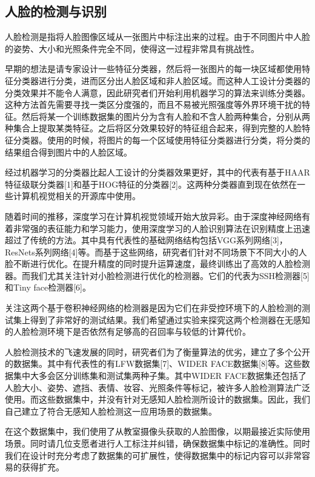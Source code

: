 \subsection{人脸的检测与识别}

人脸检测是指将人脸图像区域从一张图片中标注出来的过程。由于不同图片中人脸的姿势、大小和光照条件完全不同，使得这一过程非常具有挑战性。

早期的想法是请专家设计一些特征分类器，然后将一张图片的每一块区域都使用特征分类器进行分类，进而区分出人脸区域和非人脸区域。而这种人工设计分类器的分类效果并不能令人满意，因此研究者们开始利用机器学习的算法来训练分类器。这种方法首先需要寻找一类区分度强的，而且不易被光照强度等外界环境干扰的特征。然后将某一个训练数据集的图片分为含有人脸和不含人脸两种集合，分别从两种集合上提取某类特征。之后将区分效果较好的特征组合起来，得到完整的人脸特征分类器。使用的时候，将图片的每一个区域使用特征分类器进行分类，将分类的结果组合得到图片中的人脸区域。

经过机器学习的分类器比起人工设计的分类器效果更好，其中的代表有基于HAAR特征级联分类器[1]和基于HOG特征的分类器[2]。这两种分类器直到现在依然在一些计算机视觉相关的开源库中使用。

随着时间的推移，深度学习在计算机视觉领域开始大放异彩。由于深度神经网络有着非常强的表征能力和学习能力，使用深度学习的人脸识别算法在识别精度上迅速超过了传统的方法。其中具有代表性的基础网络结构包括VGG系列网络[3]，ResNets系列网络[4]等。而基于这些网络，研究者们针对不同场景下不同大小的人脸不断进行优化。在提升精度的同时提升运算速度，最终训练出了高效的人脸检测器。而我们尤其关注针对小脸检测进行优化的检测器。它们的代表为SSH检测器[5]和Tiny face检测器[6]。

关注这两个基于卷积神经网络的检测器是因为它们在非受控环境下的人脸检测的测试集上得到了非常好的测试结果。我们希望通过实验来探究这两个检测器在无感知的人脸检测环境下是否依然有足够高的召回率与较低的计算代价。

人脸检测技术的飞速发展的同时，研究者们为了衡量算法的优劣，建立了多个公开的数据集。其中有代表性的有LFW数据集[7]、WIDER FACE数据集[8]等。这些数据集中大多会区分训练集和测试集两种子集。其中WIDER FACE数据集还包括了人脸大小、姿势、遮挡、表情、妆容、光照条件等标记，被许多人脸检测算法广泛使用。而这些数据集中，并没有针对无感知人脸检测所设计的数据集。因此，我们自己建立了符合无感知人脸检测这一应用场景的数据集。

在这个数据集中，我们使用了从教室摄像头获取的人脸图像，以期最接近实际使用场景。同时请几位支愿者进行人工标注并纠错，确保数据集中标记的准确性。同时我们在设计时充分考虑了数据集的可扩展性，使得数据集中的标记内容可以非常容易的获得扩充。

